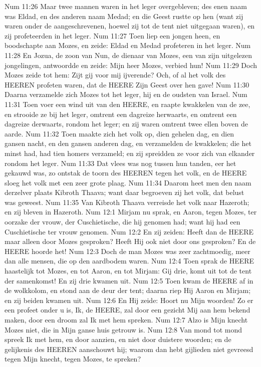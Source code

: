Num 11:26  Maar twee mannen waren in het leger overgebleven; des enen naam was Eldad, en des anderen naam Medad; en die Geest rustte op hen (want zij waren onder de aangeschrevenen, hoewel zij tot de tent niet uitgegaan waren), en zij profeteerden in het leger.
Num 11:27  Toen liep een jongen heen, en boodschapte aan Mozes, en zeide: Eldad en Medad profeteren in het leger.
Num 11:28  En Jozua, de zoon van Nun, de dienaar van Mozes, een van zijn uitgelezen jongelingen, antwoordde en zeide: Mijn heer Mozes, verbied hun!
Num 11:29  Doch Mozes zeide tot hem: Zijt gij voor mij ijverende? Och, of al het volk des HEEREN profeten waren, dat de HEERE Zijn Geest over hen gave!
Num 11:30  Daarna verzamelde zich Mozes tot het leger, hij en de oudsten van Israel.
Num 11:31  Toen voer een wind uit van den HEERE, en raapte kwakkelen van de zee, en strooide ze bij het leger, omtrent een dagreize herwaarts, en omtrent een dagreize derwaarts, rondom het leger; en zij waren omtrent twee ellen boven de aarde.
Num 11:32  Toen maakte zich het volk op, dien gehelen dag, en dien gansen nacht, en den gansen anderen dag, en verzamelden de kwakkelen; die het minst had, had tien homers verzameld; en zij spreidden ze voor zich van elkander rondom het leger.
Num 11:33  Dat vlees was nog tussen hun tanden, eer het gekauwd was, zo ontstak de toorn des HEEREN tegen het volk, en de HEERE sloeg het volk met een zeer grote plaag.
Num 11:34  Daarom heet men den naam derzelver plaats Kibroth Thaava; want daar begroeven zij het volk, dat belust was geweest.
Num 11:35  Van Kibroth Thaava verreisde het volk naar Hazeroth; en zij bleven in Hazeroth.
Num 12:1  Mirjam nu sprak, en Aaron, tegen Mozes, ter oorzake der vrouw, der Cuschietische, die hij genomen had; want hij had een Cuschietische ter vrouw genomen.
Num 12:2  En zij zeiden: Heeft dan de HEERE maar alleen door Mozes gesproken? Heeft Hij ook niet door ons gesproken? En de HEERE hoorde het!
Num 12:3  Doch de man Mozes was zeer zachtmoedig, meer dan alle mensen, die op den aardbodem waren.
Num 12:4  Toen sprak de HEERE haastelijk tot Mozes, en tot Aaron, en tot Mirjam: Gij drie, komt uit tot de tent der samenkomst! En zij drie kwamen uit.
Num 12:5  Toen kwam de HEERE af in de wolkkolom, en stond aan de deur der tent; daarna riep Hij Aaron en Mirjam; en zij beiden kwamen uit.
Num 12:6  En Hij zeide: Hoort nu Mijn woorden! Zo er een profeet onder u is, Ik, de HEERE, zal door een gezicht Mij aan hem bekend maken, door een droom zal Ik met hem spreken.
Num 12:7  Alzo is Mijn knecht Mozes niet, die in Mijn ganse huis getrouw is.
Num 12:8  Van mond tot mond spreek Ik met hem, en door aanzien, en niet door duistere woorden; en de gelijkenis des HEEREN aanschouwt hij; waarom dan hebt gijlieden niet gevreesd tegen Mijn knecht, tegen Mozes, te spreken?
